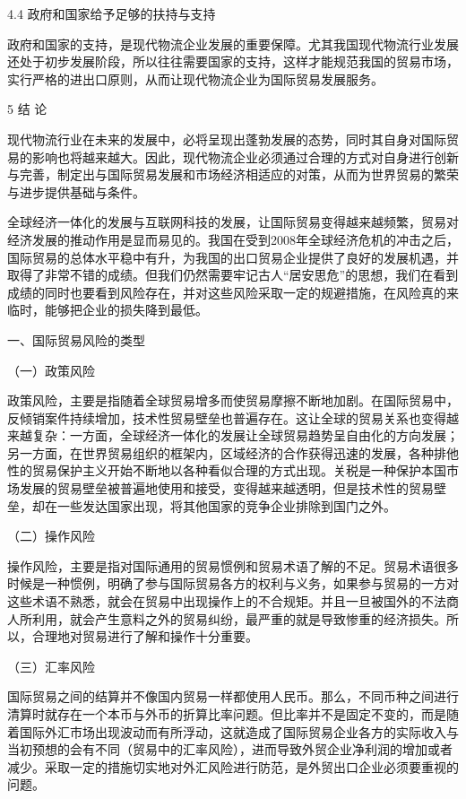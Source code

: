 4.4 政府和国家给予足够的扶持与支持

政府和国家的支持，是现代物流企业发展的重要保障。尤其我国现代物流行业发展还处于初步发展阶段，所以往往需要国家的支持，这样才能规范我国的贸易市场，实行严格的进出口原则，从而让现代物流企业为国际贸易发展服务。

5 结 论

现代物流行业在未来的发展中，必将呈现出蓬勃发展的态势，同时其自身对国际贸易的影响也将越来越大。因此，现代物流企业必须通过合理的方式对自身进行创新与完善，制定出与国际贸易发展和市场经济相适应的对策，从而为世界贸易的繁荣与进步提供基础与条件。













全球经济一体化的发展与互联网科技的发展，让国际贸易变得越来越频繁，贸易对经济发展的推动作用是显而易见的。我国在受到2008年全球经济危机的冲击之后，国际贸易的总体水平稳中有升，为我国的出口贸易企业提供了良好的发展机遇，并取得了非常不错的成绩。但我们仍然需要牢记古人“居安思危”的思想，我们在看到成绩的同时也要看到风险存在，并对这些风险采取一定的规避措施，在风险真的来临时，能够把企业的损失降到最低。

一、国际贸易风险的类型

（一）政策风险

政策风险，主要是指随着全球贸易增多而使贸易摩擦不断地加剧。在国际贸易中，反倾销案件持续增加，技术性贸易壁垒也普遍存在。这让全球的贸易关系也变得越来越复杂：一方面，全球经济一体化的发展让全球贸易趋势呈自由化的方向发展；另一方面，在世界贸易组织的框架内，区域经济的合作获得迅速的发展，各种排他性的贸易保护主义开始不断地以各种看似合理的方式出现。关税是一种保护本国市场发展的贸易壁垒被普遍地使用和接受，变得越来越透明，但是技术性的贸易壁垒，却在一些发达国家出现，将其他国家的竞争企业排除到国门之外。

（二）操作风险

操作风险，主要是指对国际通用的贸易惯例和贸易术语了解的不足。贸易术语很多时候是一种惯例，明确了参与国际贸易各方的权利与义务，如果参与贸易的一方对这些术语不熟悉，就会在贸易中出现操作上的不合规矩。并且一旦被国外的不法商人所利用，就会产生意料之外的贸易纠纷，最严重的就是导致惨重的经济损失。所以，合理地对贸易进行了解和操作十分重要。

（三）汇率风险

国际贸易之间的结算并不像国内贸易一样都使用人民币。那么，不同币种之间进行清算时就存在一个本币与外币的折算比率问题。但比率并不是固定不变的，而是随着国际外汇市场出现波动而有所浮动，这就造成了国际贸易企业各方的实际收入与当初预想的会有不同（贸易中的汇率风险），进而导致外贸企业净利润的增加或者减少。采取一定的措施切实地对外汇风险进行防范，是外贸出口企业必须要重视的问题。

